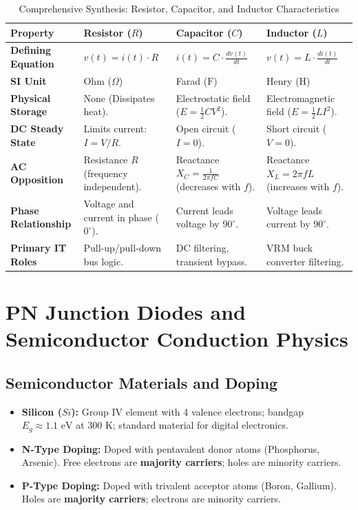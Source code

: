\begin{table}[htbp]
\centering
\small
\caption{Comprehensive Synthesis: Resistor, Capacitor, and Inductor Characteristics}
\label{tab:rlc_comparison}
\begin{tabularx}{\textwidth}{l X X X}
\toprule
\textbf{Property} & \textbf{Resistor ($R$)} & \textbf{Capacitor ($C$)} & \textbf{Inductor ($L$)} \\
\midrule
\textbf{Defining Equation} & $v(t) = i(t) \cdot R$ & $i(t) = C \cdot \frac{dv(t)}{dt}$ & $v(t) = L \cdot \frac{di(t)}{dt}$ \\
\textbf{SI Unit} & Ohm ($\Omega$) & Farad ($\text{F}$) & Henry ($\text{H}$) \\
\textbf{Physical Storage} & None (Dissipates heat). & Electrostatic field ($E = \frac{1}{2}CV^2$). & Electromagnetic field ($E = \frac{1}{2}LI^2$). \\
\textbf{DC Steady State} & Limits current: $I = V/R$. & Open circuit ($I = 0$). & Short circuit ($V = 0$). \\
\textbf{AC Opposition} & Resistance $R$ (frequency independent). & Reactance $X_C = \frac{1}{2\pi f C}$ (decreases with $f$). & Reactance $X_L = 2\pi f L$ (increases with $f$). \\
\textbf{Phase Relationship} & Voltage and current in phase ($0^{\circ}$). & Current leads voltage by $90^{\circ}$. & Voltage leads current by $90^{\circ}$. \\
\textbf{Primary IT Roles} & Pull-up/pull-down bus logic. & DC filtering, transient bypass. & VRM buck converter filtering. \\
\bottomrule
\end{tabularx}
\end{table}


\section{PN Junction Diodes and Semiconductor Conduction Physics}
\label{sec:pn_junction}

\subsection{Semiconductor Materials and Doping}
\begin{itemize}
    \item \textbf{Silicon ($Si$):} Group IV element with 4 valence electrons; bandgap $E_g \approx 1.1\text{ eV}$ at $300\text{ K}$; standard material for digital electronics.
    \item \textbf{N-Type Doping:} Doped with pentavalent donor atoms (Phosphorus, Arsenic). Free electrons are \textbf{majority carriers}; holes are minority carriers.
    \item \textbf{P-Type Doping:} Doped with trivalent acceptor atoms (Boron, Gallium). Holes are \textbf{majority carriers}; electrons are minority carriers.
\end{itemize}

